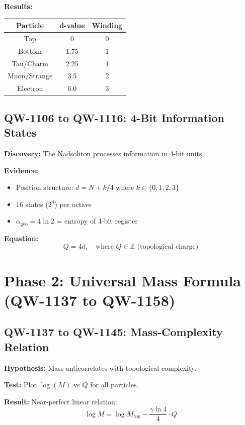 \documentclass[11pt, a4paper]{article}
\theoremstyle{remark}
\newcommand{\alphageo}{\alpha_{\text{geo}}}
\begin{document}
\textbf{Results:}
\begin{center}
\begin{tabular}{|c|c|c|}
\hline
\textbf{Particle} & \textbf{d-value} & \textbf{Winding} \\
\hline
Top & 0 & 0 \\
Bottom & 1.75 & 1 \\
Tau/Charm & 2.25 & 1 \\
Muon/Strange & 3.5 & 2 \\
Electron & 6.0 & 3 \\
\hline
\end{tabular}
\end{center}

\subsection{QW-1106 to QW-1116: 4-Bit Information States}

\textbf{Discovery:} The Nadsoliton processes information in 4-bit units.

\textbf{Evidence:}
\begin{itemize}
    \item Position structure: $d = N + k/4$ where $k \in \{0, 1, 2, 3\}$
    \item 16 states ($2^4$) per octave
    \item $\alphageo = 4\ln 2$ = entropy of 4-bit register
\end{itemize}

\textbf{Equation:}
\begin{equation}
Q = 4d, \quad \text{where } Q \in \mathbb{Z} \text{ (topological charge)}
\end{equation}

\section{Phase 2: Universal Mass Formula (QW-1137 to QW-1158)}

\subsection{QW-1137 to QW-1145: Mass-Complexity Relation}

\textbf{Hypothesis:} Mass anticorrelates with topological complexity.

\textbf{Test:} Plot $\log(M)$ vs $Q$ for all particles.

\textbf{Result:} Near-perfect linear relation:
\begin{equation}
\log M = \log M_{top} - \frac{\gamma \ln 4}{4} \cdot Q
\end{equation}
\end{document}
